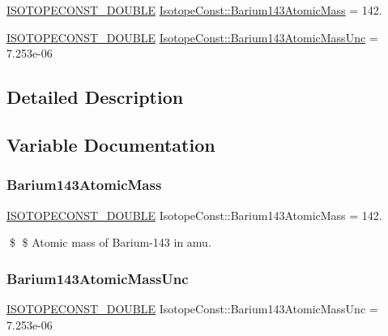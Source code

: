 \begin{DoxyCompactItemize}
\item 
\mbox{\hyperlink{group___isotope_const-_macros_ga8f45a7272ce02c0b4c65c44636ed719a}{I\+S\+O\+T\+O\+P\+E\+C\+O\+N\+S\+T\+\_\+\+D\+O\+U\+B\+LE}} \mbox{\hyperlink{group___isotope_const-_barium-_ba143_ga257a21a46074e64a728502d691cc0c22}{Isotope\+Const\+::\+Barium143\+Atomic\+Mass}} = 142.
\item 
\mbox{\hyperlink{group___isotope_const-_macros_ga8f45a7272ce02c0b4c65c44636ed719a}{I\+S\+O\+T\+O\+P\+E\+C\+O\+N\+S\+T\+\_\+\+D\+O\+U\+B\+LE}} \mbox{\hyperlink{group___isotope_const-_barium-_ba143_ga2236fe317b5157fd9b29a5a29bb45939}{Isotope\+Const\+::\+Barium143\+Atomic\+Mass\+Unc}} = 7.\+253e-\/06
\end{DoxyCompactItemize}


\subsection{Detailed Description}


\subsection{Variable Documentation}
\mbox{\label{group___isotope_const-_barium-_ba143_ga257a21a46074e64a728502d691cc0c22}} 
\subsubsection{\texorpdfstring{Barium143\+Atomic\+Mass}{Barium143AtomicMass}}
{\footnotesize\ttfamily \mbox{\hyperlink{group___isotope_const-_macros_ga8f45a7272ce02c0b4c65c44636ed719a}{I\+S\+O\+T\+O\+P\+E\+C\+O\+N\+S\+T\+\_\+\+D\+O\+U\+B\+LE}} Isotope\+Const\+::\+Barium143\+Atomic\+Mass = 142.}

\$ \$ Atomic mass of Barium-\/143 in amu. \mbox{\label{group___isotope_const-_barium-_ba143_ga2236fe317b5157fd9b29a5a29bb45939}} 
\subsubsection{\texorpdfstring{Barium143\+Atomic\+Mass\+Unc}{Barium143AtomicMassUnc}}
{\footnotesize\ttfamily \mbox{\hyperlink{group___isotope_const-_macros_ga8f45a7272ce02c0b4c65c44636ed719a}{I\+S\+O\+T\+O\+P\+E\+C\+O\+N\+S\+T\+\_\+\+D\+O\+U\+B\+LE}} Isotope\+Const\+::\+Barium143\+Atomic\+Mass\+Unc = 7.\+253e-\/06}

